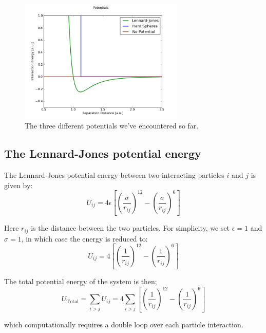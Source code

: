 \documentclass{article}
\begin{document}
\begin{figure}[h!]
\begin{center}
    \includegraphics[width=0.7\textwidth]{images/potentials.png}
    \caption{The three different potentials we've encountered so far.}
    \label{fig:potentials}
\end{center}
\end{figure}


\subsection{The Lennard-Jones potential energy}

The Lennard-Jones potential energy between two interacting particles $i$ and $j$ is given by:
\begin{equation}
    U_{ij} = 4 \epsilon \left[ \left(\frac{\sigma}{r_{ij}} \right)^{12} - \left(\frac{\sigma}{r_{ij}} \right)^6 \right]  \label{eq:lennard_jones}
\end{equation}

Here $r_{ij}$ is the distance between the two particles.
For simplicity, we set $\epsilon = 1$ and $\sigma = 1$, in which case the energy is reduced to:
\begin{equation}
    U_{ij} = 4 \left[ \left(\frac{1}{r_{ij}} \right)^{12} - \left(\frac{1}{r_{ij}} \right)^6 \right]\label{eq:potential_energy}
\end{equation}

The total potential energy of the system is then;
\begin{equation}
    U_{\mathrm{Total}}
    = \sum_{i>j} U_{ij}
    = 4 \sum_{i>j} \left[ \left(\frac{1}{r_{ij}} \right)^{12} - \left(\frac{1}{r_{ij}} \right)^6 \right] \label{eq:total_energy}
\end{equation}

which computationally requires a double loop over each particle interaction.
\end{document}
